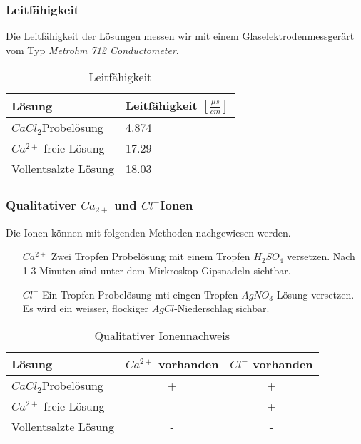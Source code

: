 \documentclass[10pt,oneside,a4paper,fleqn]{article}
\begin{document}
\subsubsection{Leitfähigkeit}
Die Leitfähigkeit der Lösungen messen wir mit einem Glaselektrodenmessgerärt vom
Typ \textit{Metrohm 712 Conductometer}.

\begin{table}[h]
\caption{Leitfähigkeit}
\label{tab:leitfaehigkeit}
\centering
	\begin{tabular}{|l|l|}
		\hline
		Lösung & Leitfähigkeit $\left[\frac{\mu s}{cm}\right]$\\
		\hline
		$CaCl_{2}$Probelösung & 4.874 \\
		\hline
		$Ca^{2+}$ freie Lösung & 17.29\\
		\hline
		Vollentsalzte Lösung & 18.03 \\
		\hline
	\end{tabular}
\end{table}

\subsubsection{Qualitativer $Ca_{2+}$ und $Cl^{-}$Ionen}
Die Ionen können mit folgenden Methoden nachgewiesen werden.
\begin{itemize}
  \item[$Ca^{2+}$] Zwei Tropfen Probelösung mit einem Tropfen $H_2SO_4$
  versetzen. Nach 1-3 Minuten sind unter dem Mirkroskop Gipsnadeln sichtbar.
  \item[$Cl^-$] Ein Tropfen Probelösung mti eingen Tropfen $AgNO_{3}$-Lösung
  versetzen. Es wird ein weisser, flockiger $AgCl$-Niederschlag sichbar.
\end{itemize}

\begin{table}[h]
\caption{Qualitativer Ionennachweis}
\label{tab:ionenNachweis}
\centering
	\begin{tabular}{|l|c|c|}
		\hline
		Lösung & $Ca^{2+}$ vorhanden & $Cl^-$ vorhanden\\
		\hline
		$CaCl_{2}$Probelösung & + & + \\
		\hline
		$Ca^{2+}$ freie Lösung & - & + \\
		\hline
		Vollentsalzte Lösung & - & -\\
		\hline
	\end{tabular}
\end{table}
\end{document}
